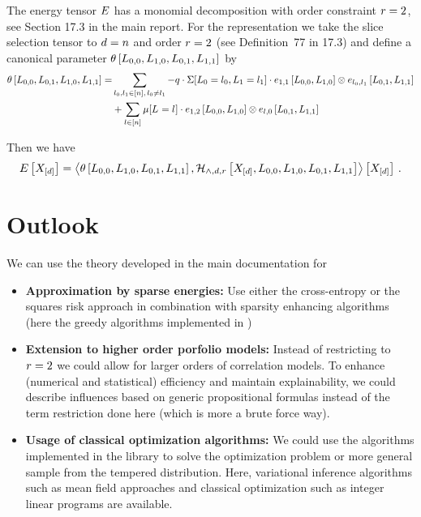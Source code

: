 \documentclass[aps,onecolumn,nofootinbib,pra]{article}
\begin{document}
The energy tensor $E$ has a monomial decomposition with order constraint $r=2$, see Section 17.3 in the main report.
For the representation we take the slice selection tensor to $d=n$ and order $r=2$ (see Definition~77 in 17.3) and define a canonical parameter $\theta\left[L_{0,0},L_{1,0},L_{0,1},L_{1,1}\right]$ by 
\begin{align*}
	\theta\left[L_{0,0},L_{0,1},L_{1,0},L_{1,1}\right]
	= & \sum_{l_{0},l_{1}\in[n], \, l_{0}\neq l_{1}}	
	-q \cdot \Sigma[L_{0}=l_{0},L_{1}=l_{1}]  \cdot e_{1,1}\left[L_{0,0},L_{1,0}\right] \otimes e_{l_{0},l_{1}}\left[L_{0,1},L_{1,1}\right]\\
	& + \sum_{l\in[n]}  \mu[L_{}=l_{}] \cdot  e_{1,2}\left[L_{0,0},L_{1,0}\right] \otimes e_{l,0}\left[L_{0,1},L_{1,1}\right]
\end{align*}


Then we have
\begin{align*}
	E\left[X_{[d]}\right] 
	= \left\langle \theta\left[L_{0,0},L_{1,0},L_{0,1},L_{1,1}\right],\mathcal{H}_{\land,d,r}\left[X_{[d]},L_{0,0},L_{1,0},L_{0,1},L_{1,1}\right]\right\rangle \left[ X_{[d]} \right] \, . 
\end{align*}

\section{Outlook}

We can use the theory developed in the main documentation for
\begin{itemize}
	\item \textbf{Approximation by sparse energies:} Use either the cross-entropy or the squares risk approach in combination with sparsity enhancing algorithms (here the greedy algorithms implemented in \tnreason)
	\item \textbf{Extension to higher order porfolio models:} Instead of restricting to $r=2$ we could allow for larger orders of correlation models.
		To enhance (numerical and statistical) efficiency and maintain explainability, we could describe influences based on generic propositional formulas instead of the term restriction done here (which is more a brute force way).
	\item \textbf{Usage of classical optimization algorithms:} We could use the algorithms implemented in the \tnreason library to solve the optimization problem or more general sample from the tempered distribution.
		Here, variational inference algorithms such as mean field approaches and classical optimization such as integer linear programs are available.
\end{itemize}
\end{document}
